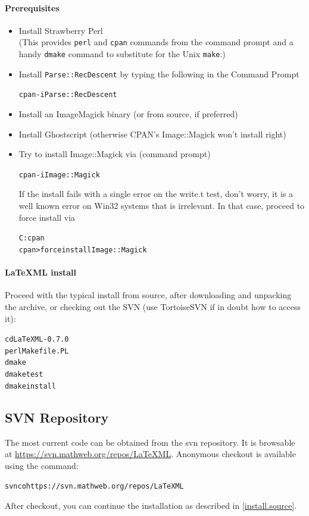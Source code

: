 \documentclass{article}
\begin{document}
\paragraph{Prerequisites}
\begin{itemize}
\item Install  Strawberry Perl\\
  (This provides \texttt{perl} and \texttt{cpan} commands from the command prompt
   and a handy \texttt{dmake} command to substitute for the Unix \texttt{make}.) 
\item Install \texttt{Parse::RecDescent} by typing the following in the Command Prompt
\begin{alltt}
  cpan -i Parse::RecDescent
\end{alltt}
\item Install an  ImageMagick binary (or from source, if preferred)
\item Install  Ghostscript (otherwise CPAN's Image::Magick won't install right)
\item Try to install Image::Magick via (command prompt)
\begin{alltt}
  cpan -i Image::Magick
\end{alltt}
 If the install fails with a single error on the write.t test, don't worry,
it is a well known error on Win32 systems that is irrelevant.
In that case, proceed to force install via
\begin{alltt}
  C:\>cpan
  cpan>force install Image::Magick
\end{alltt}
\end{itemize}
\paragraph{LaTeXML install}
Proceed with the typical install from source, after downloading and unpacking the archive, or checking out the SVN (use TortoiseSVN if in doubt how to access it):
\begin{alltt}
 cd LaTeXML-0.7.0
 perl Makefile.PL
 dmake
 dmake test
 dmake install
\end{alltt}

\subsection{SVN Repository}\label{download.svn}
The most current code can be obtained from the svn repository.
It is browsable at \url{https://svn.mathweb.org/repos/LaTeXML}.
Anonymous checkout is available using the command:
\begin{alltt}
  svn co https://svn.mathweb.org/repos/LaTeXML
\end{alltt}
After checkout, you can continue the installation
as described in \ref{install.source}.
\end{document}
